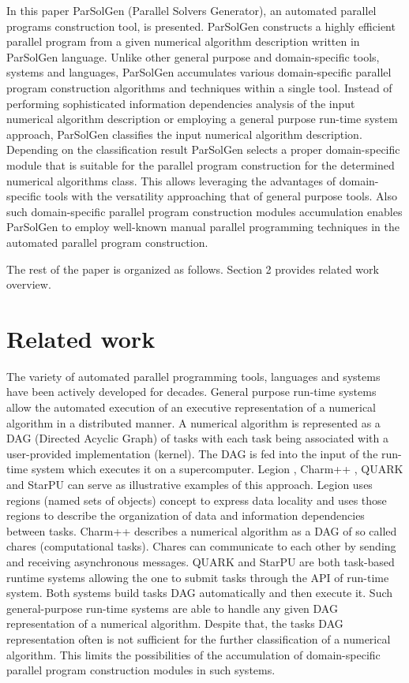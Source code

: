 \documentclass[conference]{IEEEtran}
\begin{document}
In this paper ParSolGen (Parallel Solvers Generator), an automated parallel programs construction 
tool, is presented. ParSolGen constructs a highly efficient parallel program from a given numerical 
algorithm description written in ParSolGen language. Unlike other general purpose and domain-specific 
tools, systems and languages, ParSolGen accumulates various domain-specific 
parallel program construction algorithms and techniques within a single tool. Instead of performing 
sophisticated information dependencies analysis of the input numerical algorithm description or 
employing a general purpose run-time system approach, ParSolGen classifies the input numerical 
algorithm description. Depending on the classification result ParSolGen selects a proper domain-specific module 
that is suitable for the parallel program construction for the determined numerical algorithms class. 
This allows leveraging the advantages of domain-specific tools with the versatility approaching 
that of general purpose tools. Also such domain-specific parallel program construction modules 
accumulation enables ParSolGen to employ well-known manual parallel programming techniques 
in the automated parallel program construction.

The rest of the paper is organized as follows. Section 2 provides related work overview.

\section{Related work}
The variety of automated parallel programming tools, languages and systems have been actively developed 
for decades. General purpose run-time systems allow the automated execution of an executive representation 
of a numerical algorithm in a distributed manner. A numerical algorithm is represented as a DAG 
(Directed Acyclic Graph) of tasks with each task being associated with a user-provided implementation (kernel). 
The DAG is fed into the input of the run-time system which 
executes it on a supercomputer. Legion \cite{legion}, Charm++ \cite{charm, charm1}, QUARK \cite{quark} and 
StarPU \cite{starpu} can serve as illustrative examples of this approach. Legion uses regions (named sets of objects) concept to express data locality 
and uses those regions to describe the organization of data and information dependencies between tasks. 
Charm++ describes a numerical algorithm as a DAG of so called chares (computational tasks). Chares can communicate 
to each other by sending and receiving asynchronous messages. QUARK and 
StarPU are both task-based runtime systems allowing the one to submit tasks through the API of run-time system. 
Both systems build tasks DAG automatically and then execute it. Such general-purpose run-time systems are 
able to handle any given DAG representation of a numerical algorithm. Despite that, the tasks DAG representation 
often is not sufficient for the further classification of a numerical algorithm. This limits the 
possibilities of the accumulation of domain-specific parallel program construction modules in such systems.
\end{document}
